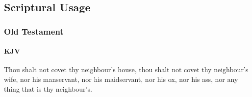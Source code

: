 
\subsection{Scriptural Usage} %
	\label{COVENT-SCRIPTURES}
	

	\subsubsection{Old Testament} %
		\label{COVENT-OT}
	
		\paragraph{KJV}
			\label{COVENT-OT-KJV}
	
			
			\begin{compactdesc}
				\item[{\hyperref[EXODUS-20-17]{Exodus 20:17}}] Thou shalt not covet thy neighbour's house, thou shalt not covet thy neighbour's wife, nor his manservant, nor his maidservant, nor his ox, nor his ass, nor any thing that is thy neighbour's.
			\end{compactdesc}
			
		
			
